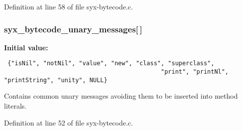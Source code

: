 Definition at line 58 of file syx-bytecode.c.\hypertarget{syx-bytecode_8c_2d5efd1c4984dc8e4a86ac7062a41716}{
\subsubsection{ {\bf syx\_\-bytecode\_\-unary\_\-messages}\mbox{[}$\,$\mbox{]}}}
\label{syx-bytecode_8c_2d5efd1c4984dc8e4a86ac7062a41716}


\textbf{Initial value:}

\begin{Code}\begin{verbatim} {"isNil", "notNil", "value", "new", "class", "superclass",
                                            "print", "printNl", "printString", "unity", NULL}
\end{verbatim}
\end{Code}
Contains common unary messages avoiding them to be inserted into method literals. 

Definition at line 52 of file syx-bytecode.c.